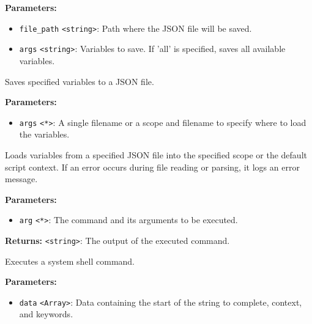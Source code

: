 \documentclass[12pt,a4paper]{article}
\begin{document}
\noindent \textbf{Parameters:}
\begin{itemize}
  \item \texttt{file\_path} \texttt{<string>}: Path where the JSON file will be saved.
  \item \texttt{args} \texttt{<string>}: Variables to save. If 'all' is specified, saves all available variables.
\end{itemize}

\noindent Saves specified variables to a JSON file.

\vspace{5mm}
\noindent {}


\noindent \textbf{Parameters:}
\begin{itemize}
  \item \texttt{args} \texttt{<*>}: A single filename or a scope and filename to specify where to load the variables.
\end{itemize}

\noindent Loads variables from a specified JSON file into the specified scope or the default script context.
If an error occurs during file reading or parsing, it logs an error message.

\vspace{5mm}
\noindent {}


\noindent \textbf{Parameters:}
\begin{itemize}
  \item \texttt{arg} \texttt{<*>}: The command and its arguments to be executed.
\end{itemize}

\noindent \textbf{Returns:} \texttt{<string>}: The output of the executed command.

\noindent Executes a system shell command.

\vspace{5mm}
\noindent {}


\noindent \textbf{Parameters:}
\begin{itemize}
  \item \texttt{data} \texttt{<Array>}: Data containing the start of the string to complete, context, and keywords.
\end{itemize}
\end{document}
